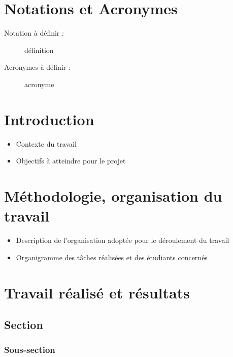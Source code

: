 \documentclass[a4paper, 12pt]{report}
\begin{document}
  
	\chapter*{Notations et Acronymes}		%

\begin{description}
	\item[Notation à définir :] définition
	\item[Acronymes à définir :] acronyme
\end{description}

\newpage
	\chapter*{Introduction}				%

	\begin{itemize}
	\item Contexte du travail
	\item Objectifs à atteindre pour le projet
	\end{itemize}

	\chapter{Méthodologie, organisation du travail}

	\begin{itemize}
	\item Description de l’organisation adoptée pour le déroulement du travail
	\item Organigramme des tâches réalisées et des étudiants concernés
	\end{itemize}

	\chapter{Travail réalisé et résultats}

		\section{Section}

			\subsection{Sous-section}
\end{document}
